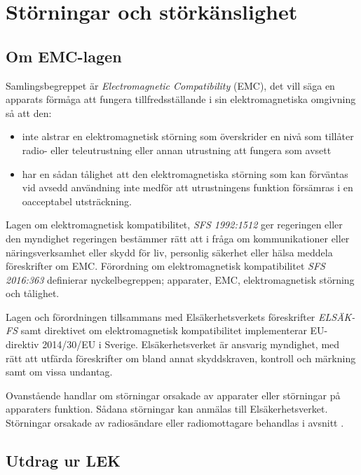 \section{Störningar och störkänslighet}

\subsection{Om EMC-lagen}
\label{EMC-lagen}

Samlingsbegreppet är \emph{Electromagnetic Compatibility} (EMC), det vill säga
en apparats förmåga att fungera tillfredsställande i sin elektromagnetiska
omgivning så att den:

\begin{itemize}
\item inte alstrar en elektromagnetisk störning som överskrider en nivå som
  tillåter radio- eller teleutrustning eller annan utrustning att fungera som
  avsett

\item har en sådan tålighet att den elektromagnetiska störning som kan
  förväntas vid avsedd användning inte medför att utrustningens funktion
  försämras i en oacceptabel utsträckning.
\end{itemize}

Lagen om elektromagnetisk kompatibilitet, \emph{SFS 1992:1512} \cite{SFS1992:1512}
ger regeringen eller den myndighet regeringen bestämmer rätt att i fråga om
kommunikationer eller näringsverksamhet eller skydd för liv, personlig säkerhet
eller hälsa meddela föreskrifter om EMC.
Förordning om elektromagnetisk kompatibilitet \emph{SFS 2016:363}
\cite{SFS2016:363} definierar nyckelbegreppen; apparater, EMC, elektromagnetisk
störning och tålighet.

Lagen och förordningen tillsammans med Elsäkerhetsverkets föreskrifter
\emph{ELSÄK-FS} samt direktivet om elektromagnetisk kompatibilitet implementerar
EU-direktiv 2014/30/EU i Sverige.
Elsäkerhetsverket är ansvarig myndighet, med rätt att utfärda föreskrifter om
bland annat skyddskraven, kontroll och märkning samt om vissa undantag.

Ovanstående handlar om störningar orsakade av apparater eller störningar på
apparaters funktion.
Sådana störningar kan anmälas till Elsäkerhetsverket.
Störningar orsakade av radiosändare eller radiomottagare behandlas i avsnitt
.

\newpage
\subsection{Utdrag ur LEK}
\label{LEK}

